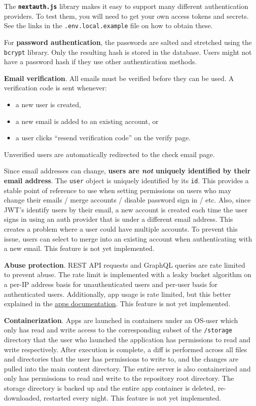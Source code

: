 The \textbf{\texttt{nextauth.js}} library makes it easy to support many
different authentication providers. To test them, you will need to get
your own access tokens and secrets. See the links in the
\texttt{.env.local.example} file on how to obtain these.

For \textbf{password authentication}, the passwords are salted and
stretched using the \texttt{bcrypt} library. Only the resulting hash is
stored in the database. Users might not have a password hash if they use
other authentication methods.

\textbf{Email verification}. All emails must be verified before they can
be used. A verification code is sent whenever:

\begin{itemize}
\tightlist
\item
  a new user is created,
\item
  a new email is added to an existing account, or
\item
  a user clicks ``resend verification code'' on the verify page.
\end{itemize}

Unverified users are automatically redirected to the check email page.

Since email addresses can change, \textbf{users are \emph{not} uniquely
identified by their email address}. The \texttt{user} object is uniquely
identified by its \texttt{id}. This provides a stable point of reference
to use when setting permissions on users who may change their emails /
merge accounts / disable password sign in / etc. Also, since JWT's
identify users by their email, a new account is created each time the
user signs in using an auth provider that is under a different email
address. This creates a problem where a user could have multiple
accounts. To prevent this issue, users can select to merge into an
existing account when authenticating with a new email. This feature is
not yet implemented.

\textbf{Abuse protection}. REST API requests and GraphQL queries are
rate limited to prevent abuse. The rate limit is implemented with a
leaky bucket algorithm on a per-IP address basis for unauthenticated
users and per-user basis for authenticated users. Additionally, app
usage is rate limited, but this better explained in the
\href{/docs/apps.md}{apps documentation}. This feature is not yet
implemented.

\textbf{Containerization}. Apps are launched in containers under an
OS-user which only has read and write access to the corresponding subset
of the \texttt{/storage} directory that the user who launched the
application has permissions to read and write respectively. After
execution is complete, a diff is performed across all files and
directories that the user has permissions to write to, and the changes
are pulled into the main content directory. The entire server is also
containerized and only has permissions to read and write to the
repository root directory. The storage directory is backed up and the
entire app container is deleted, re-downloaded, restarted every night.
This feature is not yet implemented.

